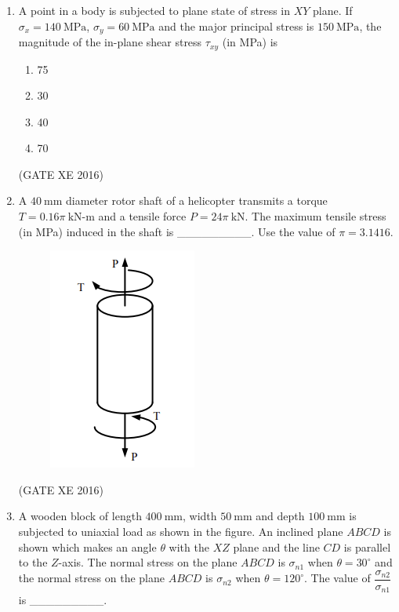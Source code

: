 \documentclass[12pt]{article}
\begin{document}
\begin{enumerate}
\begin{multicols}{2}
\end{multicols}

(GATE XE 2016)

\item A point in a body is subjected to plane state of stress in $XY$ plane. If $\sigma_x = 140 \ \text{MPa}$, $\sigma_y = 60 \ \text{MPa}$ and the major principal stress is $150 \ \text{MPa}$, the magnitude of the in-plane shear stress $\tau_{xy}$ (in MPa) is

\begin{multicols}{4}
\begin{enumerate}
\item 75
\item 30
\item 40
\item 70
\end{enumerate}
\end{multicols}

(GATE XE 2016)

\item A $40 \ \text{mm}$ diameter rotor shaft of a helicopter transmits a torque $T = 0.16 \pi \ \text{kN-m}$ and a tensile force $P = 24 \pi \ \text{kN}$. The maximum tensile stress (in MPa) induced in the shaft is \_\_\_\_\_\_\_\_\_. Use the value of $\pi = 3.1416$.

\begin{figure}[H]
    \centering
    \includegraphics[width=0.3\columnwidth]{figs/ass3_d_q20.png}
    \caption{}
    \label{fig:placeholder}
\end{figure}

(GATE XE 2016)

\item A wooden block of length $400 \ \text{mm}$, width $50 \ \text{mm}$ and depth $100 \ \text{mm}$ is subjected to uniaxial load as shown in the figure. An inclined plane $ABCD$ is shown which makes an angle $\theta$ with the $XZ$ plane and the line $CD$ is parallel to the $Z$-axis. The normal stress on the plane $ABCD$ is $\sigma_{n1}$ when $\theta = 30^\circ$ and the normal stress on the plane $ABCD$ is $\sigma_{n2}$ when $\theta = 120^\circ$. The value of $\dfrac{\sigma_{n2}}{\sigma_{n1}}$ is \_\_\_\_\_\_\_\_\_.


\end{enumerate}
\end{document}
